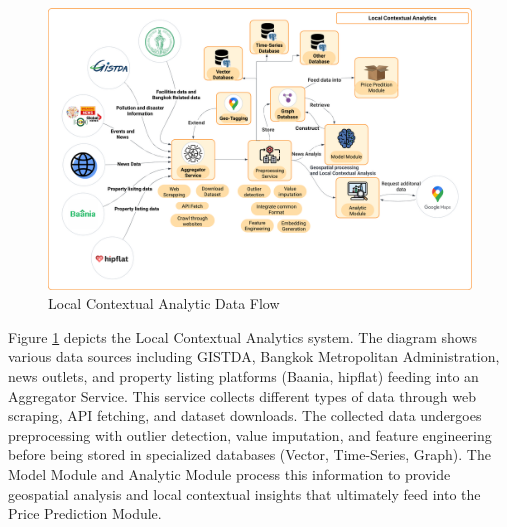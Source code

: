 \begin{figure}[htbp]
	\centering
	\includegraphics[width=1\textwidth]{assets/local-contextual-analytic.png}
	\caption{Local Contextual Analytic Data Flow}
	\label{fig:local-contextual-analytic-data-flow}
\end{figure}

\noindent Figure \ref{fig:local-contextual-analytic-data-flow} depicts the Local Contextual Analytics system. The diagram shows various data sources including GISTDA, Bangkok Metropolitan Administration,  news outlets, and property listing platforms (Baania, hipflat) feeding into an Aggregator Service. This service collects different types of data through web scraping, API fetching, and dataset downloads. The collected data undergoes preprocessing with outlier detection, value imputation, and feature engineering before being stored in specialized databases (Vector, Time-Series, Graph). The Model Module and Analytic Module process this information to provide geospatial analysis and local contextual insights that ultimately feed into the Price Prediction Module.

